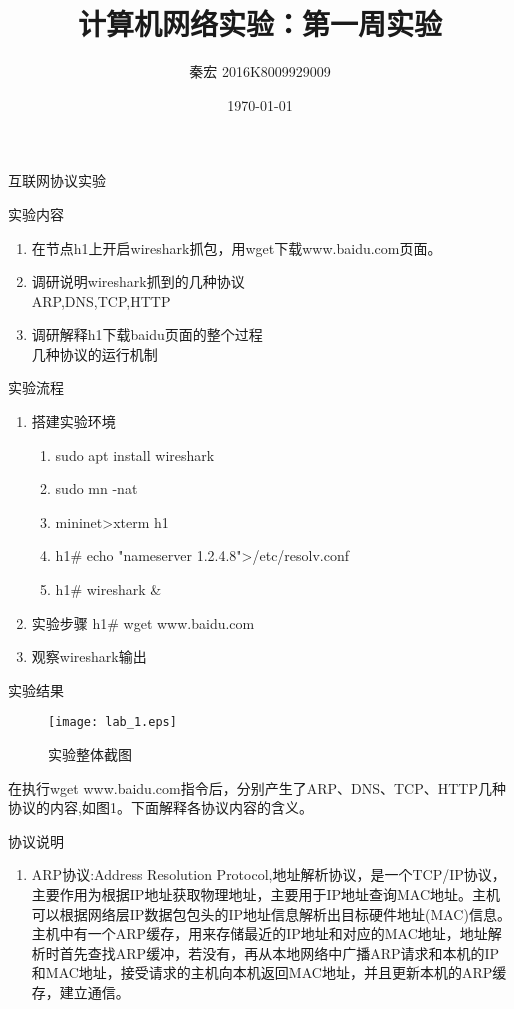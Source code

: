 \documentclass{article} %
\title{计算机网络实验：第一周实验}  %
\author{秦宏 2016K8009929009}   %
\date{\today}       %
\begin{document}
	\maketitle          %
	\begin{section}{互联网协议实验}
		\begin{subsection}{实验内容}
		\begin{enumerate}[1)]
			\item 在节点h1上开启wireshark抓包，用wget下载www.baidu.com页面。
			\item 调研说明wireshark抓到的几种协议\\
			ARP,DNS,TCP,HTTP
			\item 调研解释h1下载baidu页面的整个过程\\
			几种协议的运行机制
		\end{enumerate}
	\end{subsection}
	\begin{subsection}{实验流程}
		\begin{enumerate}[1)]
			\item 搭建实验环境
			\begin{enumerate}[(1)]
				\item sudo apt install wireshark
				\item sudo mn -nat
				\item mininet>xterm h1
				\item h1\# echo "nameserver 1.2.4.8">/etc/resolv.conf
				\item h1\# wireshark \&
			\end{enumerate}
			\item 实验步骤
			h1\# wget www.baidu.com
			\item 观察wireshark输出
		\end{enumerate}
	\end{subsection}
	\begin{subsection}{实验结果}
		\begin{figure}[h]	
			\centering
			\texttt{[image: lab\_1.eps]}	
			\caption{实验整体截图}
		\end{figure}
		在执行wget www.baidu.com指令后，分别产生了ARP、DNS、TCP、HTTP几种协议的内容,如图1。下面解释各协议内容的含义。
		\begin{subsubsection}{协议说明}
			\begin{enumerate}[1)]
				\item ARP协议:Address Resolution Protocol,地址解析协议，是一个TCP/IP协议，主要作用为根据IP地址获取物理地址，主要用于IP地址查询MAC地址。主机可以根据网络层IP数据包包头的IP地址信息解析出目标硬件地址(MAC)信息。主机中有一个ARP缓存，用来存储最近的IP地址和对应的MAC地址，地址解析时首先查找ARP缓冲，若没有，再从本地网络中广播ARP请求和本机的IP和MAC地址，接受请求的主机向本机返回MAC地址，并且更新本机的ARP缓存，建立通信。

\end{enumerate}
\end{subsubsection}
\end{subsection}
\end{section}
\end{document}
